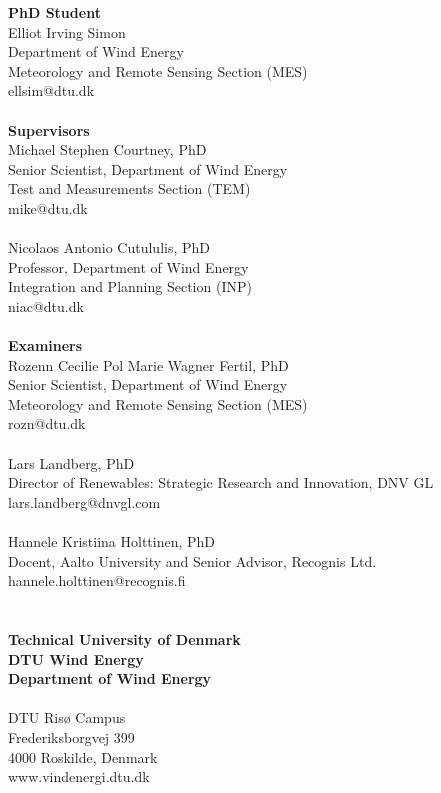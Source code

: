 \thispagestyle{empty} %
\frieze
\vspace*{\fill}
\noindent
\sffamily
\small
\textbf{PhD Student}\\
Elliot Irving Simon\\
Department of Wind Energy\\
Meteorology and Remote Sensing Section (MES)\\
ellsim@dtu.dk\\
\\
\textbf{Supervisors}\\
Michael Stephen Courtney, PhD\\
Senior Scientist, Department of Wind Energy\\
Test and Measurements Section (TEM)\\
mike@dtu.dk\\
\\
Nicolaos Antonio Cutululis, PhD\\
Professor, Department of Wind Energy\\
Integration and Planning Section (INP)\\
niac@dtu.dk\\
\\
\textbf{Examiners}\\
Rozenn Cecilie Pol Marie Wagner Fertil, PhD\\
Senior Scientist, Department of Wind Energy\\
Meteorology and Remote Sensing Section (MES)\\
rozn@dtu.dk\\
\\
Lars Landberg, PhD\\
Director of Renewables: Strategic Research and Innovation, DNV GL\\
lars.landberg@dnvgl.com\\
\\
Hannele Kristiina Holttinen, PhD\\
Docent, Aalto University and Senior Advisor, Recognis Ltd.\\
hannele.holttinen@recognis.fi\\
\\\\
\textbf{Technical University of Denmark}\\
\textbf{DTU Wind Energy}\\
\textbf{Department of Wind Energy}\\
\\
DTU Ris{\o} Campus\\
Frederiksborgvej 399\\
4000 Roskilde, Denmark\\
www.vindenergi.dtu.dk\\\\
\normalsize
\normalfont
